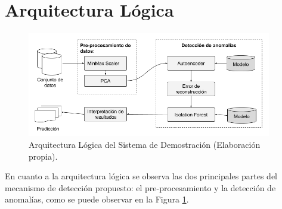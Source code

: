 \section{Arquitectura L\'{o}gica} 

\begin{figure}[h!]
  \begin{center}	\includegraphics[width=0.95\textwidth, fbox]{imagenes/Apendices/arquitectura_logica}
  \caption{Arquitectura L\'{o}gica del Sistema de Demostraci\'{o}n (Elaboraci\'{o}n propia).}
  \label{fig:arq_log}  
  \end{center}
\end{figure}


En cuanto a la arquitectura l\'{o}gica se observa las dos principales partes del mecanismo de detecci\'{o}n propuesto: el pre-procesamiento y la detecci\'{o}n de anomal\'{i}as, como se puede observar en la Figura \ref{fig:arq_log}.
